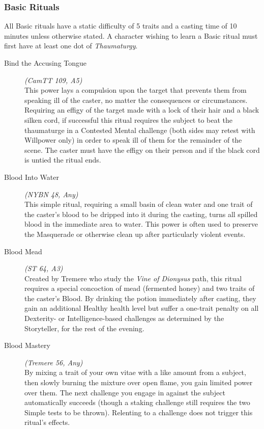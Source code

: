 \subsubsection{Basic Rituals}
All Basic rituals have a static difficulty of 5 traits and a casting time of 10 minutes unless otherwise stated.  
A character wishing to learn a Basic ritual must first have at least one dot of \emph{Thaumaturgy}. \\

\begin{description}
	\item[Bind the Accusing Tongue] \emph{(CamTT 109, A5)} \hfill \\ 
	This power lays a compulsion upon the target that prevents them from speaking ill of the caster, no matter the 
	consequences or circumstances.  Requiring an effigy of the target made with a lock of their hair and a black 
	silken cord, if successful this ritual requires the subject to beat the thaumaturge in a Contested Mental 
	challenge (both sides may retest with Willpower only) in order to speak ill of them for the remainder of the 
	scene.  The caster must have the effigy on their person and if the black cord is untied the ritual ends. \\

	\item[Blood Into Water] \emph{(NYBN 48, Any)} \hfill \\
	This simple ritual, requiring a small basin of clean water and one trait of the caster's blood to be dripped 
	into it during the casting, turns all spilled blood in the immediate area to water.  This power is often used 
	to preserve the Masquerade or otherwise clean up after particularly violent events. \\

	\item[Blood Mead] \emph{(ST 64, A3)} \hfill \\ 
	Created by Tremere who study the \emph{Vine of Dionysus} path, this ritual requires a special concoction of 
	mead (fermented honey) and two traits of the caster's Blood.  By drinking the potion immediately after 
	casting, they gain an additional Healthy health level but suffer a one-trait penalty on all Dexterity- or 
	Intelligence-based challenges as determined by the Storyteller, for the rest of the evening. \\

	\item[Blood Mastery] \emph{(Tremere 56, Any)} \hfill \\
	By mixing a trait of your own vitae with a like amount from a subject, then slowly burning the mixture over 
	open flame, you gain limited power over them.  The next challenge you engage in against the subject automatically 
	succeeds (though a staking challenge still requires the two Simple tests to be thrown). Relenting to a challenge 
	does not trigger this ritual's effects. \\


\end{description}
